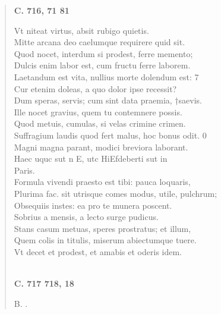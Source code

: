 \documentclass[11pt, a4paper]{report}
\begin{document}
\begin{verse}
     \marginpar{[182]} \begin{center} \textbf{C. 716, 71 81} \end{center}Vt niteat virtus, absit rubigo quietis. \\ Mitte arcana deo caelumque requirere quid sit. \\ Quod nocet, interdum si prodest, ferre memento; \\ Dulcis enim labor est, cum fructu ferre laborem. \\ Laetandum est vita, nullius morte dolendum est: 7 \\ Cur etenim doleas, a quo dolor ipse recessit? \\ Dum speras, servis; cum sint data praemia, †saevis. \\ Ille nocet gravius, quem tu contemnere possis. \\ Quod metuis, cumulas, si velas crimine crimen. \\ Suffragium laudis quod fert malus, hoc bonus odit. 0 \\ Magni magna parant, modici breviora laborant. \\ Haec uquc sut n E, utc HiEfdeberti sut in \\ Paris. \\ Formula vivendi praesto est tibi: pauca loquaris, \\ Plurima fac. sit utrisque comes modus, utile, pulchrum; \\ Obsequiis instes: ea pro te munera poscent. \\ Sobrius a mensis, a lecto surge pudicus. \\ Stans casum metuas, speres prostratus; et illum, \\ Quem colis in titulis, miserum abiectumque tuere. \\ Vt decet et prodest, et amabis et oderis idem. \\ 
        ﻿\pagebreak 
     \marginpar{[183]} \begin{center} \textbf{C. 717 718, 18} \end{center}B. . \\ 
      \end{verse}
  
\end{document}
